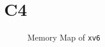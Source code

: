 \documentclass[11pt,a4paper,english]{paper}
\begin{document}
\section{C4}
\begin{figure}[H]
    \centering
    \def\svgwidth{0.5\columnwidth}
    
    \caption{Memory Map of \texttt{xv6}}
\end{figure}





\newpage %



\end{document}
